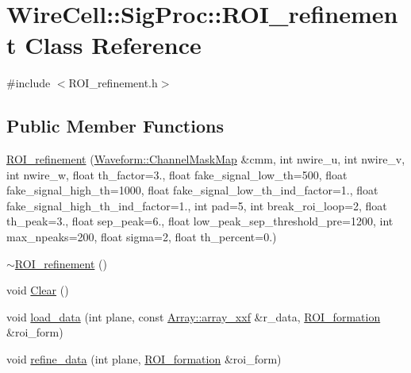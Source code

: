 \hypertarget{class_wire_cell_1_1_sig_proc_1_1_r_o_i__refinement}{}\section{Wire\+Cell\+:\+:Sig\+Proc\+:\+:R\+O\+I\+\_\+refinement Class Reference}
\label{class_wire_cell_1_1_sig_proc_1_1_r_o_i__refinement}


{\ttfamily \#include $<$R\+O\+I\+\_\+refinement.\+h$>$}

\subsection*{Public Member Functions}
\begin{DoxyCompactItemize}
\item 
\hyperlink{class_wire_cell_1_1_sig_proc_1_1_r_o_i__refinement_ad7b2030a624f7cc8753c028696792bb9}{R\+O\+I\+\_\+refinement} (\hyperlink{namespace_wire_cell_1_1_waveform_a18b9ae61c858e340252ba3ac83ac3bc0}{Waveform\+::\+Channel\+Mask\+Map} \&cmm, int nwire\+\_\+u, int nwire\+\_\+v, int nwire\+\_\+w, float th\+\_\+factor=3., float fake\+\_\+signal\+\_\+low\+\_\+th=500, float fake\+\_\+signal\+\_\+high\+\_\+th=1000, float fake\+\_\+signal\+\_\+low\+\_\+th\+\_\+ind\+\_\+factor=1., float fake\+\_\+signal\+\_\+high\+\_\+th\+\_\+ind\+\_\+factor=1., int pad=5, int break\+\_\+roi\+\_\+loop=2, float th\+\_\+peak=3., float sep\+\_\+peak=6., float low\+\_\+peak\+\_\+sep\+\_\+threshold\+\_\+pre=1200, int max\+\_\+npeaks=200, float sigma=2, float th\+\_\+percent=0.)
\item 
\hyperlink{class_wire_cell_1_1_sig_proc_1_1_r_o_i__refinement_a818642a2a38842b4201ce2f84269b9c7}{$\sim$\+R\+O\+I\+\_\+refinement} ()
\item 
void \hyperlink{class_wire_cell_1_1_sig_proc_1_1_r_o_i__refinement_a022c40a41ac572f1864dbd345c04159d}{Clear} ()
\item 
void \hyperlink{class_wire_cell_1_1_sig_proc_1_1_r_o_i__refinement_a2752abfaf6f0c8e84cef5dcec56010ee}{load\+\_\+data} (int plane, const \hyperlink{namespace_wire_cell_1_1_array_ab565fef5e33632bb02f0ed4be803020c}{Array\+::array\+\_\+xxf} \&r\+\_\+data, \hyperlink{class_wire_cell_1_1_sig_proc_1_1_r_o_i__formation}{R\+O\+I\+\_\+formation} \&roi\+\_\+form)
\item 
void \hyperlink{class_wire_cell_1_1_sig_proc_1_1_r_o_i__refinement_adf99f43f2c712c0e78597388afad65d0}{refine\+\_\+data} (int plane, \hyperlink{class_wire_cell_1_1_sig_proc_1_1_r_o_i__formation}{R\+O\+I\+\_\+formation} \&roi\+\_\+form)

\end{DoxyCompactItemize}
